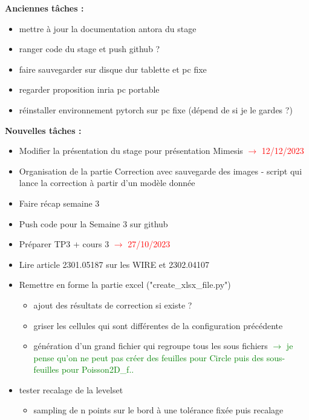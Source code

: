 \textbf{Anciennes tâches :}

\begin{itemize}[label=$\square$]
	\item mettre à jour la documentation antora du stage
	\item ranger code du stage et push github ?
	\item faire sauvegarder sur disque dur tablette et pc fixe
	\item regarder proposition inria pc portable
	\item réinstaller environnement pytorch sur pc fixe (dépend de si je le gardes ?)
\end{itemize}

\textbf{Nouvelles tâches :}

\begin{itemize}[label=$\square$]
	\item Modifier la présentation du stage pour présentation Mimesis \textcolor{red}{$\rightarrow$ 12/12/2023}
	\item[\done] Organisation de la partie Correction avec sauvegarde des images - script qui lance la correction à partir d'un modèle donnée
	\item[\done] Faire récap semaine 3
	\item[\done] Push code pour la Semaine 3 sur github
	\item[\done] Préparer TP3 + cours 3 \textcolor{red}{$\rightarrow$ 27/10/2023}
	\item[\done] Lire article 2301.05187 sur les WIRE et 2302.04107
	\item[\done] Remettre en forme la partie excel ("create\_xlsx\_file.py")
	\begin{itemize}[label=\LARGE $\circ$]
		\item[\sdone] ajout des résultats de correction si existe ?
		\item[\sdone] griser les cellules qui sont différentes de la configuration précédente
		\item[\swontfix] génération d'un grand fichier qui regroupe tous les sous fichiers \textcolor{Green}{$\rightarrow$ je pense qu'on ne peut pas créer des feuilles pour Circle puis des sous-feuilles pour Poisson2D\_f..}		
	\end{itemize}
	\item tester recalage de la levelset
	\begin{itemize}[label=\LARGE $\circ$]
		\item[\sdone] sampling de n points sur le bord à une tolérance fixée puis recalage

\end{itemize}
\end{itemize}
